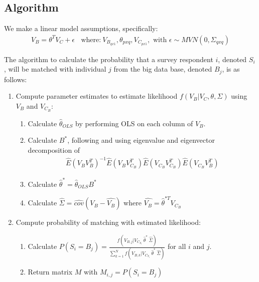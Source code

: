 \subsection{Algorithm}
We make a linear model assumptions, specifically:
\begin{align*}
V_B = \theta^TV_C + \epsilon\ \ \ \ \text{where:}\  V_{B_{qx1}}, \theta_{pxq},  V_{C_{px1}}, \text{ with }  \epsilon \sim MVN(0, \Sigma_{qxq})
\end{align*}

The algorithm to calculate the probability that a survey respondent $i$, denoted $S_i$, will be matched with individual $j$ from the big data base, denoted $B_j$, is as follows:


\begin{enumerate}
\item  \label{item:likelihood} Compute parameter estimates to estimate likelihood ${f}(V_B | V_C, \theta, \Sigma)$ using  $V_B$ and $V_{C_B}$:
\begin{enumerate}
\item Calculate $\hat\theta_{OLS}$  by performing OLS on each column of $V_B$.

\item Calculate $B^*$, following \cite{RefWorks:97} and using eigenvalue and eigenvector decomposition of 
\begin{align*}
\hat E(V_B V_B^T)^{-1}\hat E(V_B V_{C_B}^T)\hat E(V_{C_B} V_{C_B}^T)\hat E(V_{C_B} V_B^T)
\end{align*}

\item Calculate $\hat\theta^* = \hat\theta_{OLS} B^*$
\item Calculate $\hat\Sigma = \hat{cov}(V_B - \hat{V_B})$ where $\hat{V_B} =  \hat\theta^{*T} V_{C_B}$ 
\end{enumerate} 
\item \label{item:probability} Compute probability of matching with estimated likelihood:
\begin{enumerate}
\item Calculate $P(S_i = B_j) = \frac{f(V_{B,j}|V_{C_{S_i}}\ \hat{\theta}^*\  \hat{\Sigma})}{\sum^N_{k=1}f(V_{B,k}|V_{C_{S_i}}\  \hat{\theta}^*\  \hat{\Sigma})}$ for all $i$ and $j$.
\item Return matrix $M$ with $M_{i,j} = P(S_i = B_j) $
\end{enumerate}
\end{enumerate}

